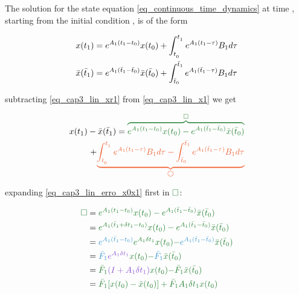 
The solution for the state equation \eqref{eq_continuous_time_dynamics} at time , starting from the initial condition , is of the form


\noindent
\begin{align}
	\label{eq_cap3_lin_x1}
	x(t_1)  &= e^{A_1(t_1-t_0)}x(t_0) + \int_{t_{_0}}^{t_{_1}} {e^{A_1(t_{1} - \tau)} B_1 d \tau} \\
	\label{eq_cap3_lin_xr1}
	\bar{x}(\bar{t}_1) &= e^{A_1(\bar{t}_1-\bar{t}_0)}\bar{x}(\bar{t}_0) + \int_{\bar{t}_{0}}^{\bar{t}_{1}} {e^{A_{1}(\bar{t}_{1} - \tau)} B_{1} d \tau}
\end{align}


\noindent
subtracting \eqref{eq_cap3_lin_xr1} from \eqref{eq_cap3_lin_x1} we get

\noindent
\begin{equation}
	\label{eq_cap3_lin_erro_x0x1}
	\begin{split}
		x(t_1) - \bar{x}(\bar{t}_1) = \green{\overbrace{e^{A_1(t_1-t_0)}x(t_0) - e^{A_1(\bar{t}_1-\bar{t}_0)}\bar{x}(\bar{t}_0)}^{\square}} \\
		+ \orange{\underbrace{\intlinAA{0}{1}{}{} - \intlinAbtt{0}{1}}_{\bigcirc}}
	\end{split}
\end{equation}

\noindent
expanding \eqref{eq_cap3_lin_erro_x0x1} first in $\green{\square}$:

\noindent
\begin{align}
	\label{eq_cap3_lin_erro_x0x1_green}
	\green{\square} &= \green{e^{A_1(t_1-t_0)}x(t_0) - e^{A_1(\bar{t}_1-\bar{t}_0)}\bar{x}(\bar{t}_0)} \nonumber \\
				  &= \green{e^{A_1(\bar{t}_1 + \delta t_1 - t_0)}x(t_0) - e^{A_1(\bar{t}_1-\bar{t}_0)}\bar{x}(\bar{t}_0)} \nonumber \\
				  &= \blue{e^{A_1(\bar{t}_1 - t_0)}} \green{e^{A_1 \delta t_1} x(t_0)} \green{-} \blue{e^{A_1(\bar{t}_1-\bar{t}_0)}}\green{\bar{x}(\bar{t}_0)} \nonumber \\
				  &= \blue{\bar{F}_1} \purple{e^{A_1 \delta t_1}} \green{x(t_0)} \green{-} \blue{\bar{F}_1}\green{\bar{x}(\bar{t}_0)} \nonumber \\
				  &= \green{\bar{F}_1} \purple{(I + A_1 \delta t_1)} \green{x(t_0)} \green{-} \green{\bar{F}_1}\green{\bar{x}(\bar{t}_0)} \nonumber \\ 
				  &= \green{\bar{F}_1 [x(t_0) - \bar{x}(t_0)] + \bar{F}_1 A_1 \delta t_1 x(t_0)}
\end{align}

